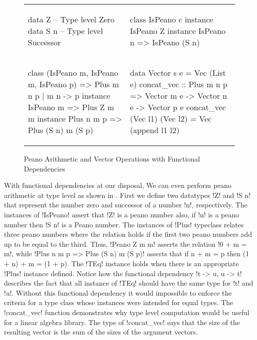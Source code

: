 \documentclass[format=sigplan,manuscript,review,screen,nonacm,margin=1in]{acmart}
\begin{document}
\begin{figure}[ht]
  \begin{tabular}{l l}
\begin{code}
data Z   -- Type level Zero
data S n -- Type level Successor
\end{code}&%
\begin{code}
class IsPeano c
instance IsPeano Z
instance IsPeano n => IsPeano (S n)
\end{code}\\
\begin{code}
class (IsPeano m, IsPeano m, IsPeano p)
  => Plus m n p | m n -> p
instance IsPeano m => Plus Z m m
instance Plus n m p => Plus (S n) m (S p)
\end{code}&%
\begin{code}
data Vector s e = Vec (List e)
concat_vec :: Plus m n p
     => Vector m e -> Vector n e -> Vector p e
concat_vec (Vec l1) (Vec l2) = Vec (append l1 l2)
\end{code}
  \end{tabular}
  \caption{Peano Arithmetic and Vector Operations with Functional Dependencies}
  \label{fig:peano-arith}
\end{figure}
With functional dependencies at our disposal, We can even perform peano arithmetic at type level
as shown in . First we define two datatypes !Z! and !S n!
that represent the number zero and successor of a number !n!, respectively.
The instances of !IsPeano! assert that !Z! is a peano number also, if !n! is a peano number
then !S n! is a Peano number. The instances of !Plus! typeclass relates three peano numbers where the relation
holds if the first two peano numbers add up to be equal to the third. Thus, !Peano Z m m! asserts the relation
!0 + m = m!, while !Plus n m p => Plus (S n) m (S p)! asserts that if n + m = p then (1 + n) + m = (1 + p).
The !TEq! instance holds when there is an appropriate !Plus! instance defined. Notice how the functional dependency
!t -> u, u -> t! describes the fact that all instance of !TEq! should have the same type for !t! and !u!. Without this
functional dependency it would impossible to enforce the criteria for a type class whose instances were intended for
equal types. The !concat_vec! function demonstrates why type level computation would be useful
for a linear algebra library. The type of !concat_vec! says that the size of the resulting
vector is the sum of the sizes of the argument vectors.
\end{document}

